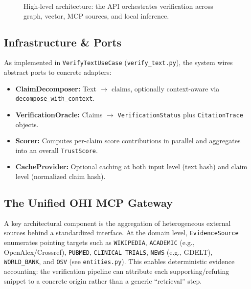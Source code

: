 \documentclass[10pt,a4paper,twocolumn]{article}
\begin{document}
\begin{figure}[t]
  \centering
  \caption{High-level architecture: the API orchestrates verification across graph, vector, MCP sources, and local inference.}
  \label{fig:arch}
\end{figure}

\subsection{Infrastructure \& Ports}
As implemented in \texttt{VerifyTextUseCase} (\texttt{verify\_text.py}), the system wires abstract ports to concrete adapters:
\begin{itemize}[leftmargin=*]
  \item \textbf{ClaimDecomposer:} Text $\rightarrow$ claims, optionally context-aware via \texttt{decompose\_with\_context}.
  \item \textbf{VerificationOracle:} Claims $\rightarrow$ \texttt{VerificationStatus} plus \texttt{CitationTrace} objects.
  \item \textbf{Scorer:} Computes per-claim score contributions in parallel and aggregates into an overall \texttt{TrustScore}.
  \item \textbf{CacheProvider:} Optional caching at both input level (text hash) and claim level (normalized claim hash).
\end{itemize}

\subsection{The Unified OHI MCP Gateway}
A key architectural component is the aggregation of heterogeneous external sources behind a standardized interface. At the domain level, \texttt{EvidenceSource} enumerates pointing targets such as \texttt{WIKIPEDIA}, \texttt{ACADEMIC} (e.g., OpenAlex/Crossref), \texttt{PUBMED}, \texttt{CLINICAL\_TRIALS}, \texttt{NEWS} (e.g., GDELT), \texttt{WORLD\_BANK}, and \texttt{OSV} (see \texttt{entities.py}). This enables deterministic evidence accounting: the verification pipeline can attribute each supporting/refuting snippet to a concrete origin rather than a generic \enquote{retrieval} step.
\end{document}

